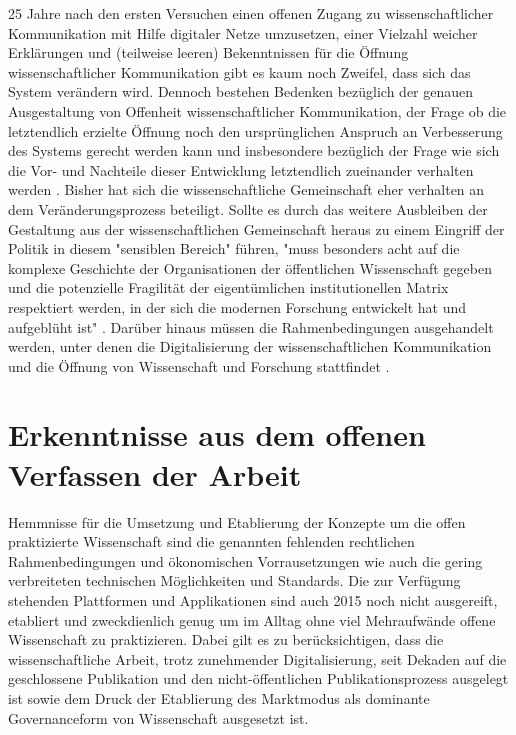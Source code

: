 25 Jahre nach den ersten Versuchen einen offenen Zugang zu wissenschaftlicher Kommunikation mit Hilfe digitaler Netze umzusetzen, einer Vielzahl weicher Erklärungen und (teilweise leeren) Bekenntnissen für die Öffnung wissenschaftlicher Kommunikation gibt es kaum noch Zweifel, dass sich das System verändern wird. Dennoch bestehen Bedenken bezüglich der genauen Ausgestaltung von Offenheit wissenschaftlicher Kommunikation, der Frage ob die letztendlich erzielte Öffnung noch den ursprünglichen Anspruch an Verbesserung des Systems gerecht werden kann und insbesondere bezüglich der Frage wie sich die Vor- und Nachteile dieser Entwicklung letztendlich zueinander verhalten werden \cite{hagner_2015_sache_buches}. Bisher hat sich die wissenschaftliche Gemeinschaft eher verhalten an dem Veränderungsprozess beteiligt. Sollte es durch das weitere Ausbleiben der Gestaltung aus der wissenschaftlichen Gemeinschaft heraus zu einem Eingriff der Politik in diesem "sensiblen Bereich" führen, "muss besonders acht auf die komplexe Geschichte der Organisationen der öffentlichen Wissenschaft gegeben und die potenzielle Fragilität der eigentümlichen institutionellen Matrix respektiert werden, in der sich die modernen Forschung entwickelt hat und aufgeblüht ist" \cite{david1998_common}. Darüber hinaus müssen die Rahmenbedingungen ausgehandelt werden, unter denen die Digitalisierung der wissenschaftlichen Kommunikation und die Öffnung von Wissenschaft und Forschung stattfindet \cite{mennes_2013_making_os}.

\section{Erkenntnisse aus dem offenen Verfassen der Arbeit}

Hemmnisse für die Umsetzung und Etablierung der Konzepte um die offen praktizierte Wissenschaft sind die genannten fehlenden rechtlichen Rahmenbedingungen und ökonomischen Vorrausetzungen wie auch die gering verbreiteten technischen Möglichkeiten und Standards. Die zur Verfügung stehenden Plattformen und Applikationen sind auch 2015 noch nicht ausgereift, etabliert und zweckdienlich genug um im Alltag ohne viel Mehraufwände offene Wissenschaft zu praktizieren. Dabei gilt es zu berücksichtigen, dass die wissenschaftliche Arbeit, trotz zunehmender Digitalisierung, seit Dekaden auf die geschlossene Publikation und den nicht-öffentlichen Publikationsprozess ausgelegt ist sowie dem Druck der Etablierung des Marktmodus als dominante Governanceform von Wissenschaft ausgesetzt ist.

